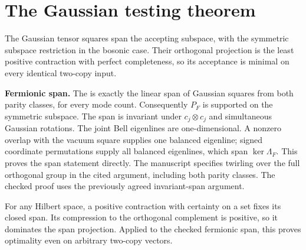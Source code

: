 \section*{The Gaussian testing theorem}

\begin{theorem}\label{target:span-optimality}
  \leanok
  \par
  The Gaussian tensor squares span the accepting subspace, with the symmetric
  subspace restriction in the bosonic case. Their orthogonal projection is
  the least positive contraction with perfect completeness, so its acceptance
  is minimal on every identical two-copy input.

  \textbf{Fermionic span.}
  The  is exactly the linear
  span of Gaussian squares from both parity classes, for every mode count.
  Consequently $P_F$ is supported on the symmetric subspace. The span is
  invariant under $c_j\otimes c_j$ and simultaneous Gaussian rotations.
  The joint Bell eigenlines are one-dimensional. A nonzero overlap with the
  vacuum square supplies one balanced eigenline; signed coordinate
  permutations supply all balanced eigenlines, which span $\ker\Lambda_F$.
  This proves the span statement directly. The manuscript specifies twirling
  over the full orthogonal group in the cited argument, including both parity
  classes. The checked proof uses the previously agreed invariant-span argument.

  For any Hilbert space, a positive contraction with certainty on a set
  fixes its closed span. Its compression to the orthogonal complement is
  positive, so it dominates the span projection. Applied to the checked
  fermionic span, this proves optimality even on arbitrary two-copy vectors.


\end{theorem}
